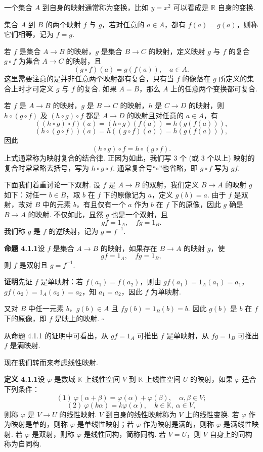 \documentclass[UTF8,12pt,a4paper,fontset=fandol]{ctexart}
\begin{document}
一个集合 $A$ 到自身的映射通常称为变换，比如 $y=x^2$ 可以看成是 $\mathbb{R}$ 自身的变换.

集合 $A$ 到 $B$ 的两个映射 $f$ 与 $g$，若对任意的 $a\in A$，都有 $f(a)=g(a)$，则称它们相等，记为 $f=g$.

若 $f$ 是集合 $A\to B$ 的映射，$g$ 是集合 $B\to C$ 的映射，定义映射 $g$ 与 $f$ 的复合 $g\circ f$ 为集合 $A\to C$ 的映射，且
\[
(g\circ f)(a)=g(f(a)),\quad a\in A.
\]
这里需要注意的是并非任意两个映射都有复合，只有当 $f$ 的像落在 $g$ 所定义的集合上时才可定义 $g$ 与 $f$ 的复合. 如果 $A=B$，那么 $A$ 上的任意两个变换都可复合.

若 $f$ 是 $A\to B$ 的映射，$g$ 是 $B\to C$ 的映射，$h$ 是 $C\to D$ 的映射，则 $h\circ(g\circ f)$ 及 $(h\circ g)\circ f$ 都是 $A\to D$ 的映射且对任意的 $a\in A$，有
\[
((h\circ g)\circ f)(a)=(h\circ g)(f(a))=h(g(f(a))),
\]
\[
(h\circ(g\circ f))(a)=h((g\circ f)(a))=h(g(f(a))),
\]
因此
\begin{equation}
(h\circ g)\circ f=h\circ(g\circ f).
\tag{4.1.1}
\end{equation}
上式通常称为映射复合的结合律. 正因为如此，我们写 3 个 (或 3 个以上) 映射的复合时常常略去括号，写为 $h\circ g\circ f$. 通常复合号“$\circ$”也省略，即 $g\circ f$ 写为 $gf$.

下面我们着重讨论一下双射. 设 $f$ 是 $A\to B$ 的双射，我们定义 $B\to A$ 的映射 $g$ 如下：对任一 $b\in B$，取 $b$ 在 $f$ 下的原像记为 $a$，定义 $g(b)=a$. 由于 $f$ 是双射，故对 $B$ 中的元素 $b$，有且仅有一个 $a$ 作为 $b$ 在 $f$ 下的原像，因此 $g$ 确是 $B\to A$ 的映射. 不仅如此，显然 $g$ 也是一个双射，且
\[
gf=1_A,\quad fg=1_B.
\]
我们称 $g$ 是 $f$ 的逆映射，记为 $g=f^{-1}$.

\noindent\textbf{命题 4.1.1}\quad 设 $f$ 是集合 $A\to B$ 的映射，如果存在 $B\to A$ 的映射 $g$，使
\[
gf=1_A,\quad fg=1_B,
\]
则 $f$ 是双射且 $g=f^{-1}$.

\noindent\textbf{证明}\quad 先证 $f$ 是单映射：若 $f(a_1)=f(a_2)$，则由 $gf(a_1)=1_A(a_1)=a_1$，$gf(a_2)=1_A(a_2)=a_2$，知 $a_1=a_2$，因此 $f$ 为单映射.

又对 $B$ 中任一元素 $b$，$g(b)\in A$ 且 $fg(b)=1_B(b)=b$. 因此 $g(b)$ 是 $b$ 在 $f$ 下的原像，即 $f$ 是映上的映射. $\square$

从命题 4.1.1 的证明中可看出，从 $gf=1_A$ 可推出 $f$ 是单映射，从 $fg=1_B$ 可推出 $f$ 是满映射.

现在我们转而来考虑线性映射.

\noindent\textbf{定义 4.1.1}\quad 设 $\varphi$ 是数域 $\mathbb{K}$ 上线性空间 $V$ 到 $\mathbb{K}$ 上线性空间 $U$ 的映射，如果 $\varphi$ 适合下列条件：
\[
(1)\ \varphi(\alpha+\beta)=\varphi(\alpha)+\varphi(\beta),\quad \alpha,\beta\in V;
\]
\[
(2)\ \varphi(k\alpha)=k\varphi(\alpha),\quad k\in\mathbb{K},\ \alpha\in V,
\]
则称 $\varphi$ 是 $V\to U$ 的线性映射. $V$ 到自身的线性映射称为 $V$ 上的线性变换. 若 $\varphi$ 作为映射是单的，则称 $\varphi$ 是单线性映射；若 $\varphi$ 作为映射是满的，则称 $\varphi$ 是满线性映射. 若 $\varphi$ 是双射，则称 $\varphi$ 是线性同构，简称同构. 若 $V=U$，则 $V$ 自身上的同构称为自同构.
\end{document}
